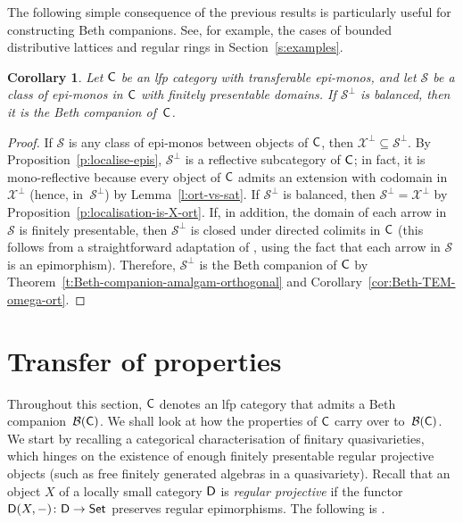 \documentclass[a4paper,10pt,reqno]{amsart}
\newtheorem{corollary}[theorem]{Corollary}
\theoremstyle{definition}
\theoremstyle{remark}
\newcommand{\cat}{{\sf C}}								%
\newcommand{\catt}{{\sf D}}								%
\newcommand{\Set}{{\sf Set}}								%
\newcommand{\B}[1]{\mathcal{B}(#1)}						%
\newcommand{\ar}[1]{\mathcal{#1}}							%
\newcommand{\X}{\ar{X}}									%
\newcommand{\ort}[1]{{#1}^{\perp}}						%
\begin{document}
The following simple consequence of the previous results is particularly useful for constructing Beth companions. See, for example, the cases of bounded distributive lattices and regular rings in Section~\ref{s:examples}.

\begin{corollary}\label{cor:S-perp-Beth-comp}
Let $\cat$ be an lfp category with transferable epi-monos, and let $\ar{S}$ be a class of epi-monos in $\cat$ with finitely presentable domains. If $\ort{\ar{S}}$ is balanced, then it is the Beth companion of~$\cat$.
\end{corollary}

\begin{proof}
If $\ar{S}$ is any class of epi-monos between objects of $\cat$, then $\ort{\X}\subseteq \ort{\ar{S}}$. By Proposition~\ref{p:localise-epis}, $\ort{\ar{S}}$ is a reflective subcategory of $\cat$; in fact, it is mono-reflective because every object of $\cat$ admits an extension with codomain in $\ort{\X}$ (hence, in~$\ort{\ar{S}}$) by Lemma~\ref{l:ort-vs-sat}.
%
If $\ort{\ar{S}}$ is balanced, then $\ort{\ar{S}}=\ort{\X}$ by Proposition~\ref{p:localisation-is-X-ort}. If, in addition, the domain of each arrow in $\ar{S}$ is finitely presentable, then $\ort{\ar{S}}$ is closed under directed colimits in $\cat$ (this follows from a straightforward adaptation of \cite[Proposition~1.35]{ar94book}, using the fact that each arrow in $\ar{S}$ is an epimorphism). 
%
Therefore, $\ort{\ar{S}}$ is the Beth companion of $\cat$ by Theorem~\ref{t:Beth-companion-amalgam-orthogonal} and Corollary~\ref{cor:Beth-TEM-omega-ort}.
\end{proof}


\section{Transfer of properties}\label{s:transfer-properties}

Throughout this section, $\cat$ denotes an lfp category that admits a Beth companion~$\B{\cat}$. We shall look at how the properties of $\cat$ carry over to~$\B{\cat}$. We start by recalling a categorical characterisation of finitary quasivarieties, which hinges on the existence of enough finitely presentable regular projective objects (such as free finitely generated algebras in a quasivariety). Recall that an object $X$ of a locally small category $\catt$ is \emph{regular projective} if the functor $\catt(X,-)\colon \catt\to\Set$ preserves regular epimorphisms. The following is \cite[Theorem~3.24]{ar94book}.
\end{document}
